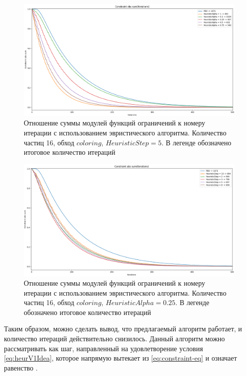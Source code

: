 	\begin{figure}[ht!] 
		\center
		\includegraphics [scale=0.4] {my_folder/images//heuristicPlotAlpha.png}
		\caption{Отношение суммы модулей функций ограничений к номеру итерации с использованием эвристического алгоритма. Количество частиц 16, обход $coloring$, $HeuristicStep=5$. В легенде обозначено итоговое количество итераций}
		\label{fig:heuristicPlotAlpha}  
	\end{figure}
	\FloatBarrier
	
	\begin{figure}[ht!] 
		\center
		\includegraphics [scale=0.4] {my_folder/images//heuristicPlotStep.png}
		\caption{Отношение суммы модулей функций ограничений к номеру итерации с использованием эвристического алгоритма. Количество частиц 16, обход $coloring$, $HeuristicAlpha=0.25$. В легенде обозначено итоговое количество итераций}
		\label{fig:heuristicPlotStep}  
	\end{figure}	
	\FloatBarrier
	
	Таким образом, можно сделать вывод, что предлагаемый алгоритм работает, и количество итераций действительно снизилось. Данный алгоритм можно рассматривать как шаг, направленный на удовлетворение условия \ref{eq:heurV1Idea}, которое напрямую вытекает из \ref{eq:constraint-eq} и означает равенство .
	
